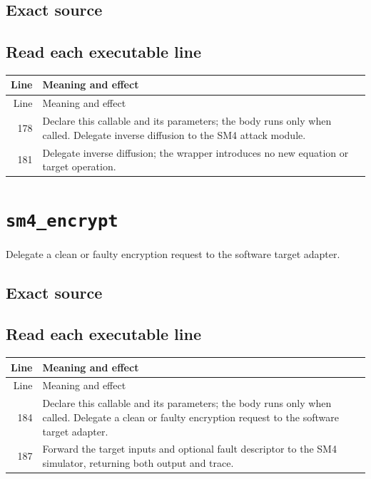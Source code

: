 \subsection*{Exact source}
\subsection*{Read each executable line}
\begingroup\small\begin{longtable}{r >{\raggedright\arraybackslash}p{138mm}}\toprule Line&Meaning and effect\\\midrule\endfirsthead\toprule Line&Meaning and effect\\\midrule\endhead
178&Declare this callable and its parameters; the body runs only when called. Delegate inverse diffusion to the SM4 attack module.\\
181&Delegate inverse diffusion; the wrapper introduces no new equation or target operation.\\
\bottomrule\end{longtable}\endgroup
\section{\texttt{sm4\_encrypt}}
Delegate a clean or faulty encryption request to the software target adapter.
\begin{center}\end{center}
\subsection*{Exact source}
\subsection*{Read each executable line}
\begingroup\small\begin{longtable}{r >{\raggedright\arraybackslash}p{138mm}}\toprule Line&Meaning and effect\\\midrule\endfirsthead\toprule Line&Meaning and effect\\\midrule\endhead
184&Declare this callable and its parameters; the body runs only when called. Delegate a clean or faulty encryption request to the software target adapter.\\
187&Forward the target inputs and optional fault descriptor to the SM4 simulator, returning both output and trace.\\
\bottomrule\end{longtable}\endgroup
